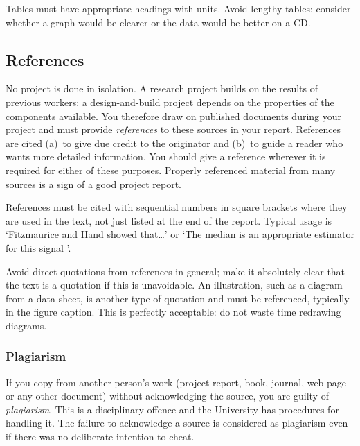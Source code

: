 \documentclass[a4paper,12pt]{article}
\begin{document}
Tables must have appropriate headings with units. Avoid lengthy tables: consider whether a graph would be clearer or the data would be better on a CD.

\subsection{References}

No project is done in isolation. A research project builds on the results of previous workers; a design-and-build project depends on the properties of the components available. You therefore draw on published documents during your project and must provide \emph{references} to these sources in your report. References are cited (a)~to give due credit to the originator and (b)~to guide a reader who wants more detailed information. You should give a reference wherever it is required for either of these purposes. Properly referenced material from many sources is a sign of a good project report. 

References must be cited with sequential numbers in square brackets where they are used in the text, not just listed at the end of the report. Typical usage is `Fitzmaurice and Hand \cite{gmf87} showed that\dots' or `The median is an appropriate estimator for this signal \cite{gmf87}'.

Avoid direct quotations from references in general; make it absolutely clear that the text is a quotation if this is unavoidable. An illustration, such as a diagram from a data sheet, is another type of quotation and must be referenced, typically in the figure caption. This is perfectly acceptable: do not waste time redrawing diagrams.

\subsubsection{Plagiarism}

If you copy from another person's work (project report, book, journal, web page or any other document) without acknowledging the source, you are guilty of \emph{plagiarism}. This is a disciplinary offence and the University has procedures for handling it. The failure to acknowledge a source is considered as plagiarism even if there was no deliberate intention to cheat. 
\end{document}
